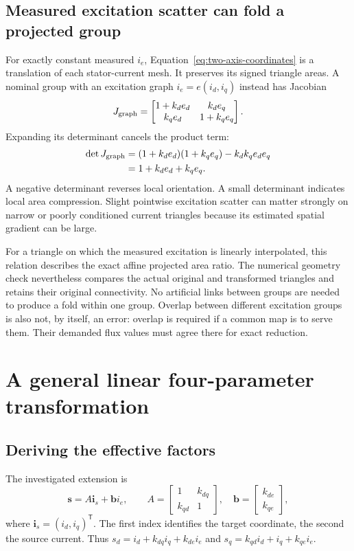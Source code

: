 \subsection{Measured excitation scatter can fold a projected group}
For exactly constant measured $i_e$, Equation~\eqref{eq:two-axis-coordinates} is a translation of each stator-current mesh. It preserves its signed triangle areas. A nominal group with an excitation graph $i_e=e(i_d,i_q)$ instead has Jacobian
\begin{equation}
J_{\rm graph}=
\begin{bmatrix}
1+k_de_d&k_de_q\\
k_qe_d&1+k_qe_q
\end{bmatrix}.
\end{equation}
Expanding its determinant cancels the product term:
\begin{align}
\det J_{\rm graph}
&=(1+k_de_d)(1+k_qe_q)-k_dk_qe_de_q\\
&=1+k_de_d+k_qe_q.\label{eq:graph-determinant}
\end{align}
A negative determinant reverses local orientation. A small determinant indicates local area compression. Slight pointwise excitation scatter can matter strongly on narrow or poorly conditioned current triangles because its estimated spatial gradient can be large.

For a triangle on which the measured excitation is linearly interpolated, this relation describes the exact affine projected area ratio. The numerical geometry check nevertheless compares the actual original and transformed triangles and retains their original connectivity. No artificial links between groups are needed to produce a fold within one group. Overlap between different excitation groups is also not, by itself, an error: overlap is required if a common map is to serve them. Their demanded flux values must agree there for exact reduction.

\section{A general linear four-parameter transformation}
\subsection{Deriving the effective factors}
The investigated extension is
\begin{equation}\label{eq:four-coordinates}
\bm s=A\bm i_s+\bm b i_e,\qquad
A=\begin{bmatrix}1&k_{dq}\\k_{qd}&1\end{bmatrix},
\quad
\bm b=\begin{bmatrix}k_{de}\\k_{qe}\end{bmatrix},
\end{equation}
where $\bm i_s=(i_d,i_q)^{\mathsf T}$. The first index identifies the target coordinate, the second the source current. Thus
$s_d=i_d+k_{dq}i_q+k_{de}i_e$ and
$s_q=k_{qd}i_d+i_q+k_{qe}i_e$.

